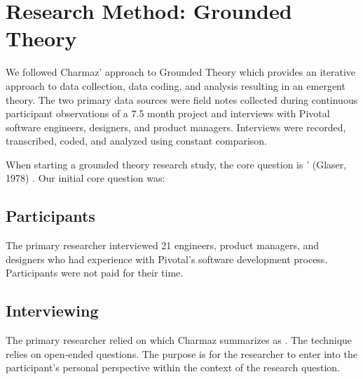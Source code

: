 \section{Research Method: Grounded Theory}
\label{ResearchMethod}

We followed Charmaz' approach to Grounded Theory \cite{Charmaz} which provides an iterative approach to data collection, data coding, and analysis resulting in an emergent theory. The two primary data sources were field notes collected during continuous participant observations of a 7.5 month project and interviews with Pivotal software engineers, designers, and product managers. Interviews were recorded, transcribed, coded, and analyzed using constant comparison. 

When starting a grounded theory research study, the core question is ' (Glaser, 1978) \cite{GlaserTheoreticalSensitivity}. Our initial core question was: 

\subsection{Participants}
The primary researcher interviewed 21 engineers, product managers, and designers who had experience with Pivotal's software development process. Participants were not paid for their time. 
\subsection{Interviewing}
The primary researcher relied on  which Charmaz summarizes as  \cite{Charmaz}. The technique relies on open-ended questions. The purpose is for the researcher to enter into the participant's personal perspective within the context of the research question. %
 
